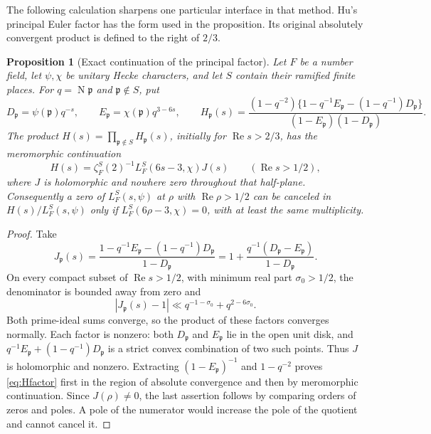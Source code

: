 \documentclass[11pt]{article}
\newcommand{\N}{\operatorname{N}}
\newcommand{\Rea}{\operatorname{Re}}
\newtheorem{proposition}[theorem]{Proposition}
\theoremstyle{definition}
\theoremstyle{remark}
\begin{document}
The following calculation sharpens one particular interface in that
method.  Hu's principal Euler factor \cite[Section~6.2, Lemma~6.1]{Hu}
has the form used in the proposition.  Its original absolutely convergent
product is defined to the right of $2/3$.

\begin{proposition}[Exact continuation of the principal factor]
\label{prop:auxiliary}
Let $F$ be a number field, let $\psi,\chi$ be unitary Hecke characters,
and let $S$ contain their ramified finite places.  For
$q=\N\mathfrak p$ and $\mathfrak p\notin S$, put
\[
 D_{\mathfrak p}=\psi(\mathfrak p)q^{-s},\qquad
 E_{\mathfrak p}=\chi(\mathfrak p)q^{3-6s},\qquad
 H_{\mathfrak p}(s)=
 \frac{(1-q^{-2})\{1-q^{-1}E_{\mathfrak p}
                     -(1-q^{-1})D_{\mathfrak p}\}}
 {(1-E_{\mathfrak p})(1-D_{\mathfrak p})}.
\]
The product $H(s)=\prod_{\mathfrak p\notin S}H_{\mathfrak p}(s)$,
initially for $\Rea s>2/3$, has the meromorphic continuation
\begin{equation}\label{eq:Hfactor}
 H(s)=\zeta_F^S(2)^{-1}L_F^S(6s-3,\chi)J(s)
 \qquad(\Rea s>1/2),
\end{equation}
where $J$ is holomorphic and nowhere zero throughout that half-plane.
Consequently a zero of $L_F^S(s,\psi)$ at $\rho$ with
$\Rea\rho>1/2$ can be canceled in $H(s)/L_F^S(s,\psi)$ only if
$L_F^S(6\rho-3,\chi)=0$, with at least the same multiplicity.
\end{proposition}

\begin{proof}
Take
\[
 J_{\mathfrak p}(s)=
 \frac{1-q^{-1}E_{\mathfrak p}-(1-q^{-1})D_{\mathfrak p}}
      {1-D_{\mathfrak p}}
 =1+\frac{q^{-1}(D_{\mathfrak p}-E_{\mathfrak p})}
            {1-D_{\mathfrak p}}.
\]
On every compact subset of $\Rea s>1/2$, with minimum real part
$\sigma_0>1/2$, the denominator is bounded away from zero and
\[
 |J_{\mathfrak p}(s)-1|
   \ll q^{-1-\sigma_0}+q^{2-6\sigma_0}.
\]
Both prime-ideal sums converge, so the product of these factors
converges normally.  Each factor is nonzero: both $D_{\mathfrak p}$
and $E_{\mathfrak p}$ lie in the open unit disk, and
$q^{-1}E_{\mathfrak p}+(1-q^{-1})D_{\mathfrak p}$ is a strict
convex combination of two such points.  Thus $J$ is holomorphic and
nonzero.  Extracting $(1-E_{\mathfrak p})^{-1}$ and $1-q^{-2}$
proves \eqref{eq:Hfactor} first in the region of absolute convergence
and then by meromorphic continuation.  Since $J(\rho)\ne0$, the
last assertion follows by comparing orders of zeros and poles.  A pole
of the numerator would increase the pole of the quotient and cannot
cancel it.
\end{proof}
\end{document}
